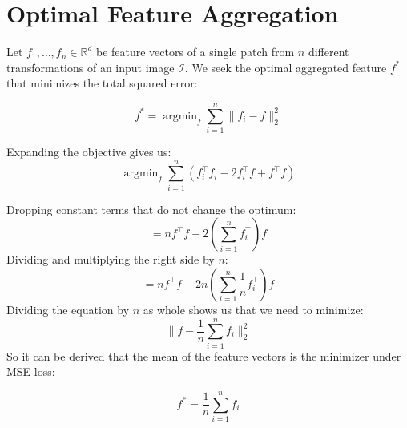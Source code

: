 \documentclass{article}
\begin{document}
\clearpage


\section{Optimal Feature Aggregation}
\label{proof}
Let $ f_{1}, \dots, f_{n} \in \mathbb{R}^d$ be feature vectors of a single patch from $n$ different transformations of an input image $\mathcal{I}$. We seek the optimal aggregated feature $f^*$ that minimizes the total squared error:

\begin{equation}
f^* = \mathop{\arg\min}_{f} \sum_{i=1}^n \|f_i - f\|_2^2
\end{equation}

Expanding the objective gives us:
\begin{equation}
\mathop{\arg\min}_f\sum_{i=1}^n (f_i^\top f_i - 2f_i^\top f + f^\top f)
\end{equation}

Dropping constant terms that do not change the optimum:
\begin{equation}
= nf^\top f - 2\left(\sum_{i=1}^n f_i^\top\right) f
\end{equation}
Dividing and multiplying the right side by $n$:
\begin{equation}
= nf^\top f - 2n\left(\sum_{i=1}^n \frac{1}{n} f_i^\top\right) f
\end{equation}
Dividing the equation by $n$ as whole shows us that we need to minimize:
\begin{equation}
\|f-\frac{1}{n}\sum_{i=1}^{n} f_i\|_{2}^{2}
\end{equation}
So it can be derived that the mean of the feature vectors is the minimizer under MSE loss: 

\begin{equation}f^* = \frac{1}{n}\sum_{i=1}^{n} f_i\end{equation}



 
\end{document}
